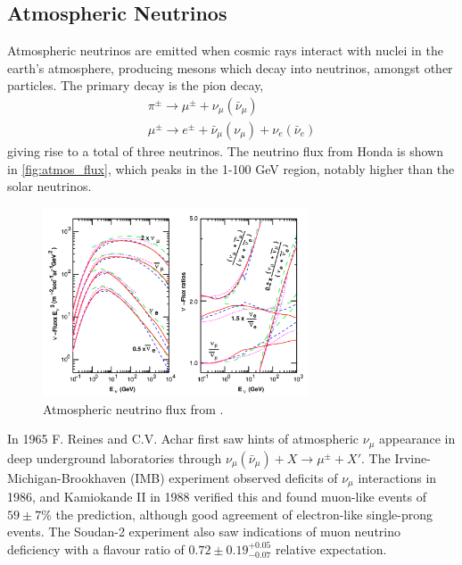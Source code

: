 \subsection{Atmospheric Neutrinos}
Atmospheric neutrinos are emitted when cosmic rays interact with nuclei in the earth's atmosphere, producing mesons which decay into neutrinos, amongst other particles. The primary decay is the pion decay,
\begin{gather*}
	\pi^\pm \rightarrow \mu^\pm + \nu_\mu(\bar{\nu}_\mu) \\
	\mu^\pm \rightarrow e^\pm + \bar{\nu}_\mu (\nu_\mu) + \nu_e (\bar{\nu}_e)
\end{gather*}
giving rise to a total of three neutrinos. The neutrino flux from Honda\cite{honda_flux} is shown in \autoref{fig:atmos_flux}, which peaks in the 1-100 GeV region, notably higher than the solar neutrinos.
\begin{figure}[h]
	\includegraphics[width=0.7\textwidth, trim={0mm 0mm 0mm 0mm}, clip,page=1]{figures/theory/honda_flux}
	\caption{Atmospheric neutrino flux from \cite{honda_flux}.}
	\label{fig:atmos_flux}
\end{figure}

In 1965 F. Reines\cite{reines_atmos} and C.V. Achar\cite{india_atmos_hint} first saw hints of atmospheric $\nu_\mu$ appearance in deep underground laboratories through $\nu_\mu(\bar{\nu}_\mu) + X \rightarrow \mu^\pm + X'$. The Irvine-Michigan-Brookhaven (IMB) experiment observed deficits of $\nu_\mu$ interactions in 1986\cite{imb}, and Kamiokande II in 1988\cite{kamiokande_atmos_hint} verified this and found muon-like events of $59\pm7\%$ the prediction, although good agreement of electron-like single-prong events. The Soudan-2 experiment\cite{soudan2} also saw indications of muon neutrino deficiency with a flavour ratio of $0.72\pm0.19^{+0.05}_{-0.07}$ relative expectation. 

